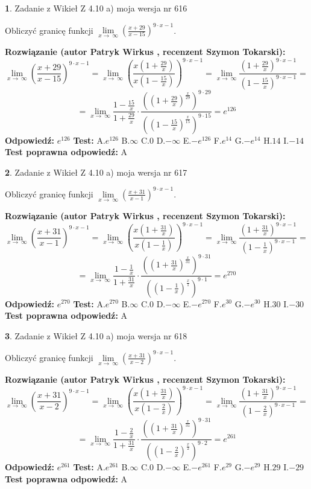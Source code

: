 \documentclass[12pt, a4paper]{article}
\theoremstyle{definition} %
\newtheorem{zad}{}
\newcommand{\zadStart}[1]{\begin{zad}#1\newline}
\newcommand{\zadStop}{\end{zad}}
\newcommand{\rozwStart}[2]{\noindent \textbf{Rozwiązanie (autor #1 , recenzent #2): }\newline}
\newcommand{\rozwStop}{\newline}
\newcommand{\odpStart}{\noindent \textbf{Odpowiedź:}\newline}
\newcommand{\odpStop}{\newline}
\newcommand{\testStart}{\noindent \textbf{Test:}\newline}
\newcommand{\testStop}{\newline}
\newcommand{\kluczStart}{\noindent \textbf{Test poprawna odpowiedź:}\newline}
\newcommand{\kluczStop}{\newline}
\begin{document}
\zadStart{Zadanie z Wikieł Z 4.10 a) moja wersja nr 616}

Obliczyć granicę funkcji  $\lim\limits_{x\to\ \infty}(\frac{x+29}{x-15})^{9\cdot x-1}$.
\zadStop
\rozwStart{Patryk Wirkus}{Szymon Tokarski}
$$\lim\limits_{x\to\ \infty}(\frac{x+29}{x-15})^{9\cdot x-1} = \lim\limits_{x\to\ \infty}(\frac{x(1+\frac{29}{x})}{x(1-\frac{15}{x})})^{9\cdot x-1}=\lim\limits_{x\to\ \infty}\frac{(1+\frac{29}{x})^{9\cdot x-1}}{(1-\frac{15}{x})^{9\cdot x-1}}=$$
$$=\lim\limits_{x\to\ \infty}\frac{1-\frac{15}{x}}{1+\frac{29}{x}}\cdot\frac{((1+\frac{29}{x})^{\frac{x}{29}})^{9\cdot29}}{((1-\frac{15}{x})^{\frac{x}{15}})^{9\cdot15}}=e^{126}$$
\rozwStop
\odpStart
$e^{126}$
\odpStop
\testStart
A.$e^{126}$ B.$\infty$ C.$0$ D.$-\infty$ E.$-e^{126}$
F.$e^{14}$ G.$-e^{14}$
H.$14$
I.$-14$
\testStop
\kluczStart
A
\kluczStop



\zadStart{Zadanie z Wikieł Z 4.10 a) moja wersja nr 617}

Obliczyć granicę funkcji  $\lim\limits_{x\to\ \infty}(\frac{x+31}{x-1})^{9\cdot x-1}$.
\zadStop
\rozwStart{Patryk Wirkus}{Szymon Tokarski}
$$\lim\limits_{x\to\ \infty}(\frac{x+31}{x-1})^{9\cdot x-1} = \lim\limits_{x\to\ \infty}(\frac{x(1+\frac{31}{x})}{x(1-\frac{1}{x})})^{9\cdot x-1}=\lim\limits_{x\to\ \infty}\frac{(1+\frac{31}{x})^{9\cdot x-1}}{(1-\frac{1}{x})^{9\cdot x-1}}=$$
$$=\lim\limits_{x\to\ \infty}\frac{1-\frac{1}{x}}{1+\frac{31}{x}}\cdot\frac{((1+\frac{31}{x})^{\frac{x}{31}})^{9\cdot31}}{((1-\frac{1}{x})^{\frac{x}{1}})^{9\cdot1}}=e^{270}$$
\rozwStop
\odpStart
$e^{270}$
\odpStop
\testStart
A.$e^{270}$ B.$\infty$ C.$0$ D.$-\infty$ E.$-e^{270}$
F.$e^{30}$ G.$-e^{30}$
H.$30$
I.$-30$
\testStop
\kluczStart
A
\kluczStop



\zadStart{Zadanie z Wikieł Z 4.10 a) moja wersja nr 618}

Obliczyć granicę funkcji  $\lim\limits_{x\to\ \infty}(\frac{x+31}{x-2})^{9\cdot x-1}$.
\zadStop
\rozwStart{Patryk Wirkus}{Szymon Tokarski}
$$\lim\limits_{x\to\ \infty}(\frac{x+31}{x-2})^{9\cdot x-1} = \lim\limits_{x\to\ \infty}(\frac{x(1+\frac{31}{x})}{x(1-\frac{2}{x})})^{9\cdot x-1}=\lim\limits_{x\to\ \infty}\frac{(1+\frac{31}{x})^{9\cdot x-1}}{(1-\frac{2}{x})^{9\cdot x-1}}=$$
$$=\lim\limits_{x\to\ \infty}\frac{1-\frac{2}{x}}{1+\frac{31}{x}}\cdot\frac{((1+\frac{31}{x})^{\frac{x}{31}})^{9\cdot31}}{((1-\frac{2}{x})^{\frac{x}{2}})^{9\cdot2}}=e^{261}$$
\rozwStop
\odpStart
$e^{261}$
\odpStop
\testStart
A.$e^{261}$ B.$\infty$ C.$0$ D.$-\infty$ E.$-e^{261}$
F.$e^{29}$ G.$-e^{29}$
H.$29$
I.$-29$
\testStop
\kluczStart
A
\kluczStop
\end{document}

